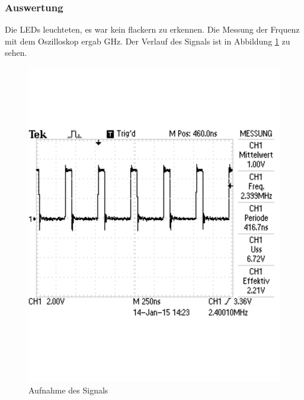 \documentclass[12pt,a4paper]{article}
\begin{document}
\subsubsection*{Auswertung}

Die LEDs leuchteten, es war kein flackern zu erkennen. Die Messung der Frquenz mit dem Oszilloskop ergab \unit[2,4]{GHz}. Der Verlauf des Signals ist in Abbildung \ref{fig:g_1} zu sehen.

\begin{figure}[H] 
  \centering 	
    \includegraphics[trim = 0mm 50mm 0mm 50mm, clip, scale = 0.4]{TEK0000.pdf}
  	\caption[Aufnahme des Signals]{Aufnahme des Signals} 
  \label{fig:g_1}
\end{figure}
\end{document}
